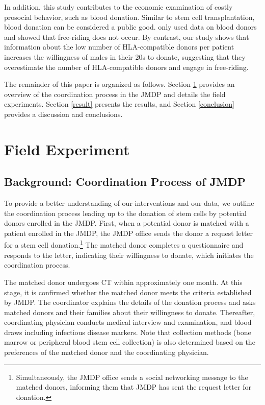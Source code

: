 \documentclass[12pt, a4paper]{article}
\begin{document}
In addition, this study contributes to the economic examination of costly prosocial behavior, such as blood donation. Similar to stem cell transplantation, blood donation can be considered a public good. \citet{Wildman2009} only used data on blood donors and showed that free-riding does not occur. By contrast, our study shows that information about the low number of HLA-compatible donors per patient increases the willingness of males in their 20s to donate, suggesting that they overestimate the number of HLA-compatible donors and engage in free-riding.

The remainder of this paper is organized as follows. Section \ref{experiment} provides an overview of the coordination process in the JMDP and details the field experiments. Section \ref{result} presents the results, and Section \ref{conclusion} provides a discussion and conclusions.

\hypertarget{experiment}{%
\section{Field Experiment}\label{experiment}}

\hypertarget{background}{%
\subsection{Background: Coordination Process of JMDP}\label{background}}

To provide a better understanding of our interventions and our data, we outline the coordination process leading up to the donation of stem cells by potential donors enrolled in the JMDP. First, when a potential donor is matched with a patient enrolled in the JMDP, the JMDP office sends the donor a request letter for a stem cell donation.\footnote{Simultaneously, the JMDP office sends a social networking message to the matched donors, informing them that JMDP has sent the request letter for donation.} The matched donor completes a questionnaire and responds to the letter, indicating their willingness to donate, which initiates the coordination process.

The matched donor undergoes CT within approximately one month. At this stage, it is confirmed whether the matched donor meets the criteria established by JMDP. The coordinator explains the details of the donation process and asks matched donors and their families about their willingness to donate. Thereafter, coordinating physician conducts medical interview and examination, and blood draws including infectious disease markers. Note that collection methods (bone marrow or peripheral blood stem cell collection) is also determined based on the preferences of the matched donor and the coordinating physician.
\end{document}
